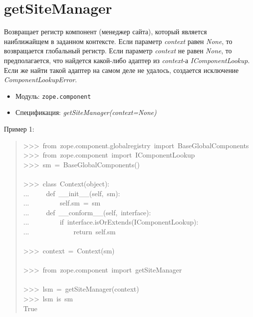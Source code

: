 \documentclass[a4paper,openany,twoside,final]{book}
\providecommand*{\DUroletitlereference}[1]{\textsl{#1}}
\begin{document}
\section*{getSiteManager%
  \label{getsitemanager}%
}

Возвращает регистр компонент (менеджер сайта), который является
наиближайщем в заданном контексте. Если параметр \DUroletitlereference{context} равен
\DUroletitlereference{None}, то возвращается глобальный регистр.  Если параметр
\DUroletitlereference{context} не равен \DUroletitlereference{None}, то предполагается, что найдется какой-либо
адаптер из \DUroletitlereference{context}-а \DUroletitlereference{IComponentLookup}.  Если же найти такой
адаптер на самом деле не удалось, создается исключение
\DUroletitlereference{ComponentLookupError}.

\begin{itemize}

\item Модуль: \texttt{zope.component}

\item Спецификация: \DUroletitlereference{getSiteManager(context=None)}

\end{itemize}

Пример 1:

\begin{quote}{\ttfamily \raggedright \noindent
>{}>{}>~from~zope.component.globalregistry~import~BaseGlobalComponents\\
>{}>{}>~from~zope.component~import~IComponentLookup\\
>{}>{}>~sm~=~BaseGlobalComponents()\\
~\\
>{}>{}>~class~Context(object):\\
...~~~~~def~\_\_init\_\_(self,~sm):\\
...~~~~~~~~~self.sm~=~sm\\
...~~~~~def~\_\_conform\_\_(self,~interface):\\
...~~~~~~~~~if~interface.isOrExtends(IComponentLookup):\\
...~~~~~~~~~~~~~return~self.sm\\
~\\
>{}>{}>~context~=~Context(sm)\\
~\\
>{}>{}>~from~zope.component~import~getSiteManager\\
~\\
>{}>{}>~lsm~=~getSiteManager(context)\\
>{}>{}>~lsm~is~sm\\
True
}
\end{quote}
\end{document}
